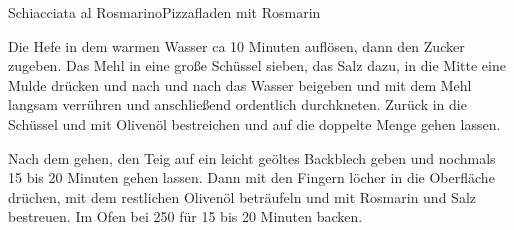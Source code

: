 \begin{recipe}{Schiacciata al Rosmarino}{Pizzafladen mit Rosmarin}
  \label{Schiacciata al Rosmarino}
  \inglist
  
  \steps
  Die Hefe in dem warmen Wasser ca 10 Minuten auflösen, dann den Zucker zugeben. Das Mehl
  in eine große Schüssel sieben, das Salz dazu, in die Mitte eine Mulde drücken und nach
  und nach das Wasser beigeben und mit dem Mehl langsam verrühren und anschließend
  ordentlich durchkneten. Zurück in die Schüssel und mit Olivenöl bestreichen und auf die
  doppelte Menge gehen lassen.

  Nach dem gehen, den Teig auf ein leicht geöltes Backblech geben und nochmals 15 bis 20
  Minuten gehen lassen. Dann mit den Fingern löcher in die Oberfläche drüchen, mit dem
  restlichen Olivenöl beträufeln und mit Rosmarin und Salz bestreuen. Im Ofen bei 250
  \celsius für 15 bis 20 Minuten backen.
\end{recipe}

